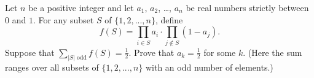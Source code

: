 Let $n$ be a positive integer and let $a_1$, $a_2$, \dots, $a_n$ be real numbers strictly between $0$ and $1$. For any subset $S$ of $\{1, 2, ..., n\}$, define \[ f(S) = \prod_{i \in S} a_i \cdot \prod_{j \not \in S} (1-a_j). \] Suppose that $\sum_{|S| \text{ odd}} f(S) = \frac{1}{2}$. Prove that $a_k = \frac{1}{2}$ for some $k$. (Here the sum ranges over all subsets of $\{1, 2, ..., n\}$ with an odd number of elements.)
